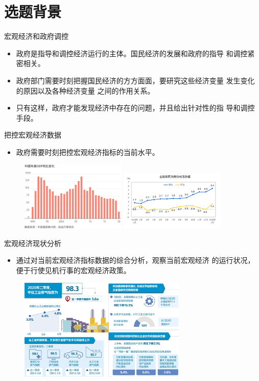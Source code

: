 \section{选题背景}

\begin{frame}{宏观经济和政府调控}

  \begin{itemize}
\item
政府是指导和调控经济运行的主体。国民经济的发展和政府的指导
和调控紧密相关。

\item
政府部门需要时刻把握国民经济的方方面面，要研究这些经济变量
发生变化的原因以及各种经济变量
之间的作用关系。

\item
只有这样，政府才能发现经济中存在的问题，并且给出针对性的指
导和调控手段。
  \end{itemize}
\end{frame}

\begin{frame}{把控宏观经济数据}
  \begin{itemize}
    \item
    政府需要时刻把控宏观经济指标的当前水平。
  \end{itemize}
\begin{figure}[H]
  \includegraphics[width=5cm]{pics/gdp.png}
  \includegraphics[width=5cm]{pics/price.png}
\end{figure}
\end{frame}

\begin{frame}{宏观经济现状分析}
  \begin{itemize}
    \item
    通过对当前宏观经济指标数据的综合分析，观察当前宏观经济
    的运行状况，便于行使见机行事的宏观经济政策。
  \end{itemize}
\begin{figure}[H]
  \includegraphics[width=8cm]{pics/macro-demo.jpeg}
\end{figure}
\end{frame}

